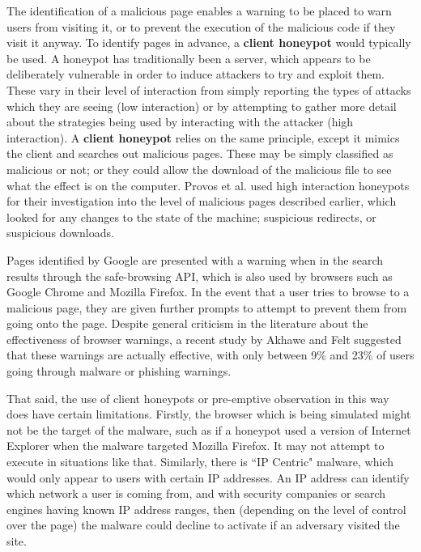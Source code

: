 \documentclass{acm_proc_article-sp}
\begin{document}
The identification of a malicious page enables a warning to be placed to warn users from visiting it, or to prevent the execution of the malicious code if they visit it anyway.  To identify pages in advance, a \textbf{client honeypot} would typically be used.  A honeypot has traditionally been a server, which appears to be deliberately vulnerable in order to induce attackers to try and exploit them.  These vary in their level of interaction from simply reporting the types of attacks which they are seeing (low interaction) or by attempting to gather more detail about the strategies being used by interacting with the attacker (high interaction).  A \textbf{client honeypot} relies on the same principle, except it mimics the client and searches out malicious pages.  These may be simply classified as malicious or not; or they could allow the download of the malicious file to see what the effect is on the computer.  Provos et al. used high interaction honeypots for their investigation into the level of malicious pages described earlier, which looked for any changes to the state of the machine; suspicious redirects, or suspicious downloads\cite{provos2008}.

Pages identified by Google are presented with a warning when in the search results through the safe-browsing API, which is also used by browsers such as Google Chrome and Mozilla Firefox.  In the event that a user tries to browse to a malicious page, they are given further prompts to attempt to prevent them from going onto the page.  Despite general criticism in the literature about the effectiveness of browser warnings, a recent study by Akhawe and Felt suggested that these warnings are actually effective, with only between 9\% and 23\% of users going through malware or phishing warnings\cite{akhawe2013}.

That said, the use of client honeypots or pre-emptive observation in this way does have certain limitations.  Firstly, the browser which is being simulated might not be the target of the malware, such as if a honeypot used a version of Internet Explorer when the malware targeted Mozilla Firefox.  It may not attempt to execute in situations like that.  Similarly, there is ``IP Centric" malware, which would only appear to users with certain IP addresses.  An IP address can identify which network a user is coming from, and with security companies or search engines having known IP address ranges, then (depending on the level of control over the page) the malware could decline to activate if an adversary visited the site.
\end{document}
